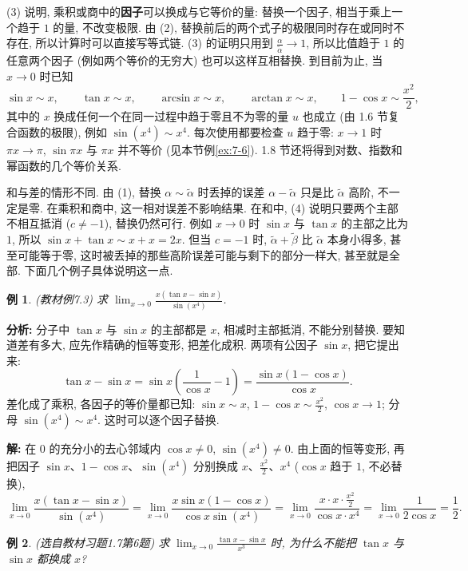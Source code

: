 \documentclass[UTF8,openany]{ctexbook}
\theoremstyle{chinesetextbook}
\newtheorem{example}{例}[section]
\newenvironment{cnsolution}{\par\indent\textbf{解:} \ignorespaces}{\par}
\begin{document}
(3) 说明, 乘积或商中的\textbf{因子}可以换成与它等价的量: 替换一个因子, 相当于乘上一个趋于 $1$ 的量, 不改变极限. 由 (2), 替换前后的两个式子的极限同时存在或同时不存在, 所以计算时可以直接写等式链. (3) 的证明只用到 $\displaystyle\frac\alpha{\widetilde\alpha}\to1$, 所以比值趋于 $1$ 的任意两个因子 (例如两个等价的无穷大) 也可以这样互相替换. 到目前为止, 当 $x\to0$ 时已知
\[
\sin x\sim x,\qquad\tan x\sim x,\qquad\arcsin x\sim x,\qquad\arctan x\sim x,\qquad1-\cos x\sim\frac{x^2}2,
\]
其中的 $x$ 换成任何一个在同一过程中趋于零且不为零的量 $u$ 也成立 (由 1.6 节复合函数的极限), 例如 $\sin(x^4)\sim x^4$. 每次使用都要检查 $u$ 趋于零: $x\to1$ 时 $\pi x\to\pi$, $\sin\pi x$ 与 $\pi x$ 并不等价 (见本节例\ref{ex:7-6}). 1.8 节还将得到对数、指数和幂函数的几个等价关系.

和与差的情形不同. 由 (1), 替换 $\alpha\sim\widetilde\alpha$ 时丢掉的误差 $\alpha-\widetilde\alpha$ 只是比 $\widetilde\alpha$ 高阶, 不一定是零. 在乘积和商中, 这一相对误差不影响结果. 在和中, (4) 说明只要两个主部不相互抵消 ($c\ne-1$), 替换仍然可行. 例如 $x\to0$ 时 $\sin x$ 与 $\tan x$ 的主部之比为 $1$, 所以 $\sin x+\tan x\sim x+x=2x$. 但当 $c=-1$ 时, $\widetilde\alpha+\widetilde\beta$ 比 $\widetilde\alpha$ 本身小得多, 甚至可能等于零, 这时被丢掉的那些高阶误差可能与剩下的部分一样大, 甚至就是全部. 下面几个例子具体说明这一点.
\begin{example}\label{ex:7-3}
\textnormal{(教材例7.3)} 求 $\displaystyle\lim_{x\to0}\frac{x(\tan x-\sin x)}{\sin(x^4)}$.
\end{example}
\par\indent\textbf{分析:} 分子中 $\tan x$ 与 $\sin x$ 的主部都是 $x$, 相减时主部抵消, 不能分别替换. 要知道差有多大, 应先作精确的恒等变形, 把差化成积. 两项有公因子 $\sin x$, 把它提出来:
\[
\tan x-\sin x=\sin x\left(\frac1{\cos x}-1\right)=\frac{\sin x(1-\cos x)}{\cos x}.
\]
差化成了乘积, 各因子的等价量都已知: $\sin x\sim x$, $\displaystyle1-\cos x\sim\frac{x^2}2$, $\cos x\to1$; 分母 $\sin(x^4)\sim x^4$. 这时可以逐个因子替换.
\begin{cnsolution}
在 $0$ 的充分小的去心邻域内 $\cos x\ne0$, $\sin(x^4)\ne0$. 由上面的恒等变形, 再把因子 $\sin x$、$1-\cos x$、$\sin(x^4)$ 分别换成 $x$、$\displaystyle\frac{x^2}2$、$x^4$ ($\cos x$ 趋于 $1$, 不必替换),
\[
\lim_{x\to0}\frac{x(\tan x-\sin x)}{\sin(x^4)}=\lim_{x\to0}\frac{x\sin x(1-\cos x)}{\cos x\sin(x^4)}=\lim_{x\to0}\frac{x\cdot x\cdot\frac{x^2}2}{\cos x\cdot x^4}=\lim_{x\to0}\frac1{2\cos x}=\frac12.
\]
\end{cnsolution}
\begin{example}
\textnormal{(选自教材习题1.7第6题)} 求 $\displaystyle\lim_{x\to0}\frac{\tan x-\sin x}{x^3}$ 时, 为什么不能把 $\tan x$ 与 $\sin x$ 都换成 $x$?
\end{example}
\end{document}
